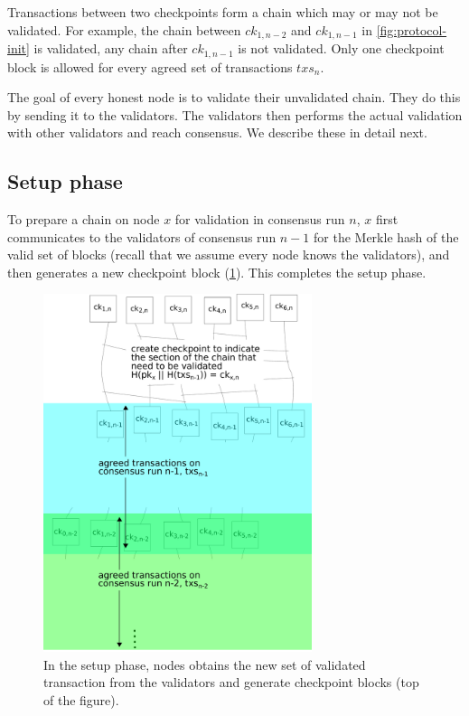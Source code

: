 Transactions between two checkpoints form a chain which may or may not be
validated. For example, the chain between $ck_{1,n-2}$ and
$ck_{1,n-1}$ in \cref{fig:protocol-init} is validated, any chain after
$ck_{1,n-1}$ is not validated. Only one checkpoint block is allowed for
every agreed set of transactions $txs_{n}$.

The goal of every honest node is to validate their unvalidated chain. They do
this by sending it to the validators. The validators then performs the actual
validation with other validators and reach consensus. We describe these in
detail next.

\subsection{Setup phase}

To prepare a chain on node $x$ for validation in consensus run $n$, $x$ first
communicates to the validators of consensus run $n-1$ for the Merkle hash of the
valid set of blocks (recall that we assume every node knows the validators), and
then generates a new checkpoint block (\cref{fig:protocol-setup}). This
completes the setup phase.

\begin{figure}[htb]
	\centering
	\includegraphics[width=0.7\textwidth]{figures/protocol-setup}
	\caption{In the setup phase, nodes obtains the new set of validated
      transaction from the validators and generate checkpoint blocks (top of the
      figure).}
    \label{fig:protocol-setup}
\end{figure}

